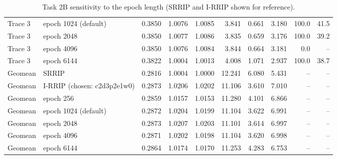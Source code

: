 \begin{table}[H]
{\begin{tabular}{llrrrrrrrr}
Trace 3 & epoch 1024 (default) & 0.3850 & 1.0076 & 1.0085 & 3.841 & 0.661 & 3.180 & 100.0 & 41.5 \\
Trace 3 & epoch 2048 & 0.3850 & 1.0077 & 1.0086 & 3.835 & 0.659 & 3.176 & 100.0 & 39.2 \\
Trace 3 & epoch 4096 & 0.3850 & 1.0076 & 1.0084 & 3.844 & 0.664 & 3.181 & 0.0 & -- \\
Trace 3 & epoch 6144 & 0.3822 & 1.0004 & 1.0013 & 4.008 & 1.071 & 2.937 & 100.0 & 38.7 \\
\midrule
Geomean & SRRIP & 0.2816 & 1.0004 & 1.0000 & 12.241 & 6.080 & 5.431 & -- & -- \\
Geomean & I-RRIP (chosen: c2d3p2e1w0) & 0.2873 & 1.0206 & 1.0202 & 11.106 & 3.610 & 7.010 & -- & -- \\
Geomean & epoch 256 & 0.2859 & 1.0157 & 1.0153 & 11.280 & 4.101 & 6.866 & -- & -- \\
Geomean & epoch 1024 (default) & 0.2872 & 1.0204 & 1.0199 & 11.104 & 3.622 & 6.991 & -- & -- \\
Geomean & epoch 2048 & 0.2873 & 1.0207 & 1.0203 & 11.101 & 3.614 & 6.997 & -- & -- \\
Geomean & epoch 4096 & 0.2871 & 1.0202 & 1.0198 & 11.104 & 3.620 & 6.998 & -- & -- \\
Geomean & epoch 6144 & 0.2864 & 1.0174 & 1.0170 & 11.253 & 4.283 & 6.753 & -- & -- \\
\bottomrule
\end{tabular}}
\ifdim\wd\fitbx>\linewidth\resizebox{\linewidth}{!}{\usebox{\fitbx}}\else\usebox{\fitbx}\fi
\caption{Task 2B sensitivity to the epoch length (SRRIP and I-RRIP shown for reference).}\label{tab:t2b_epoch}
\end{table}

